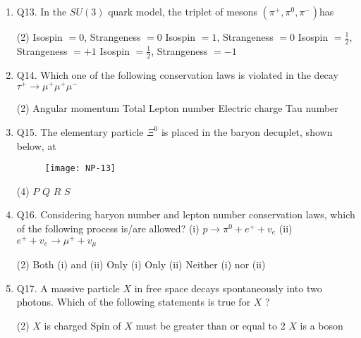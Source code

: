 \begin{enumerate}
\begin{tasks}
		\task[\textbf{c.}]Angular momentum conservation
		\task[\textbf{d.}]  Lepton number conservation
	\end{tasks}
	\item Q13. In the $S U(3)$ quark model, the triplet of mesons $\left(\pi^{+}, \pi^0, \pi^{-}\right)$has
	{}
	 \begin{tasks}(2)
		\task[\textbf{a.}]Isospin $=0$, Strangeness $=0$
		\task[\textbf{b.}] Isospin $=1$, Strangeness $=0$
		\task[\textbf{c.}]Isospin $=\frac{1}{2}$, Strangeness $=+1$
		\task[\textbf{d.}]  Isospin $=\frac{1}{2}$, Strangeness $=-1$
	\end{tasks}
	\item Q14. Which one of the following conservation laws is violated in the decay $\tau^{+} \rightarrow \mu^{+} \mu^{+} \mu^{-}$
	{}
	 \begin{tasks}(2)
		\task[\textbf{a.}]Angular momentum
		\task[\textbf{b.}]Total Lepton number
		\task[\textbf{c.}]Electric charge
		\task[\textbf{d.}]Tau number 
	\end{tasks}
	\item Q15. The elementary particle $\Xi^0$ is placed in the baryon decuplet, shown below, at
		{}
	\begin{figure}[H]
		\centering
		\texttt{[image: NP-13]}
	\end{figure}
	 \begin{tasks}(4)
		\task[\textbf{a.}]$P$
		\task[\textbf{b.}]$Q$
		\task[\textbf{c.}]$R$
		\task[\textbf{d.}] $S$ 
	\end{tasks}
	\item Q16. Considering baryon number and lepton number conservation laws, which of the following process is/are allowed?
	(i) $p \rightarrow \pi^0+e^{+}+v_e$\hspace{2cm}
	(ii) $e^{+}+v_e \rightarrow \mu^{+}+v_\mu$
	{}
	 \begin{tasks}(2)
		\task[\textbf{a.}]Both (i) and (ii)
		\task[\textbf{b.}]Only (i)
		\task[\textbf{c.}]Only (ii)
		\task[\textbf{d.}]Neither (i) nor (ii)
	\end{tasks}
	\item Q17. A massive particle $X$ in free space decays spontaneously into two photons. Which of the following statements is true for $X$ ?
{}
	 \begin{tasks}(2)
		\task[\textbf{a.}] $X$ is charged
		\task[\textbf{b.}]Spin of $X$ must be greater than or equal to 2
		\task[\textbf{c.}]$X$ is a boson

\end{tasks}
\end{enumerate}
